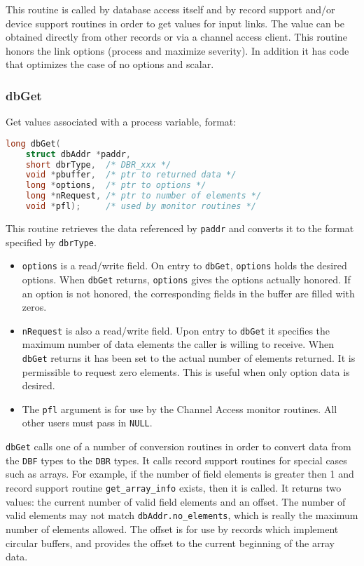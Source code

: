 This routine is called by database access itself and by record support and/or device support routines in order to get values for input links.
The value can be obtained directly from other records or via a channel access client.
This routine honors the link options (process and maximize severity).
In addition it has code that optimizes the case of no options and scalar.

\subsubsection{dbGet}

Get values associated with a process variable, format:

\begin{lstlisting}[language=C]
long dbGet(
    struct dbAddr *paddr,
    short dbrType,  /* DBR_xxx */
    void *pbuffer,  /* ptr to returned data */
    long *options,  /* ptr to options */
    long *nRequest, /* ptr to number of elements */
    void *pfl);     /* used by monitor routines */
\end{lstlisting}

This routine retrieves the data referenced by \verb|paddr| and converts it to the format specified by \verb|dbrType|.

\begin{itemize}

\item \verb|options| is a read/write field.
On entry to \verb|dbGet|, \verb|options| holds the desired options.
When \verb|dbGet| returns, \verb|options| gives the options actually honored.
If an option is not honored, the corresponding fields in the buffer are filled with zeros.

\item \verb|nRequest| is also a read/write field.
Upon entry to \verb|dbGet| it specifies the maximum number of data elements the 
caller is willing to receive.
When \verb|dbGet| returns it has been set to the actual number of elements returned.
It is permissible to request zero elements.
This is useful when only option data is desired.

\item The \verb|pfl| argument is for use by the Channel Access monitor routines.
All other users must pass in \verb|NULL|.

\end{itemize}

\verb|dbGet| calls one of a number of conversion routines in order to convert data from the \verb|DBF| types to the \verb|DBR| types.
It calls record support routines for special cases such as arrays.
For example, if the number of field elements is greater then 1 and record support routine \verb|get_array_info| exists, then it is called.
It returns two values:
the current number of valid field elements and an offset.
The number of valid elements may not match \verb|dbAddr.no_elements|, which is really the maximum number of elements allowed.
The offset is for use by records which implement circular buffers, and provides the offset to the current beginning of the array data.

